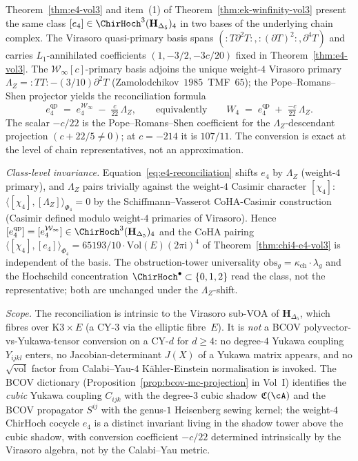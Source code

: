 \begin{remark}
\label{rem:e4-two-bases}
Theorem~\ref{thm:e4-vol3} and item~(1) of
Theorem~\ref{thm:ek-winfinity-vol3} present the same class
$[e_4]\in\ChirHoch^3(\mathbf H_{\Delta_5})_4$ in two bases of the
underlying chain complex. The Virasoro quasi-primary basis spans
$({:}T\partial^2T{:},{:}(\partial T)^2{:},\partial^4T)$ and carries
$L_1$-annihilated coefficients $(1,-3/2,-3c/20)$ fixed in
Theorem~\ref{thm:e4-vol3}. The $\mathcal W_\infty[c]$-primary basis
adjoins the unique weight-$4$ Virasoro primary
$\Lambda_Z={:}TT{:}-(3/10)\partial^2T$ (Zamolodchikov~$1985$~TMF~$65$);
the Pope--Romans--Shen projector yields the reconciliation formula
\begin{equation}\label{eq:e4-reconciliation}
 e_4^{\mathrm{qp}} \;=\; e_4^{\mathcal W_\infty}\;-\;\tfrac{c}{22}\,\Lambda_Z,
 \qquad\text{equivalently}\qquad
 W_4 \;=\; e_4^{\mathrm{qp}} \;+\;\tfrac{-c}{22}\,\Lambda_Z.
\end{equation}
The scalar $-c/22$ is the Pope--Romans--Shen coefficient for the
$\Lambda_Z$-descendant projection $(c+22/5\ne 0)$; at $c=-214$ it is
$107/11$. The conversion is exact at the level of chain
representatives, not an approximation.
\par\noindent\emph{Class-level invariance.} Equation~\ref{eq:e4-reconciliation}
shifts $e_4$ by $\Lambda_Z$ (weight-$4$ primary), and
$\Lambda_Z$ pairs trivially against the weight-$4$ Casimir
character $[\chi_4]$:
$\langle[\chi_4],[\Lambda_Z]\rangle_{\Phi_4}=0$ by the
Schiffmann--Vasserot CoHA-Casimir construction (Casimir defined modulo
weight-$4$ primaries of Virasoro).
Hence
$[e_4^{\mathrm{qp}}]=[e_4^{\mathcal W_\infty}]\in\ChirHoch^3(\mathbf H_{\Delta_5})_4$
and the CoHA pairing
$\langle[\chi_4],[e_4]\rangle_{\Phi_4}=65193/10\cdot\mathrm{Vol}(E)(2\pi\mathrm i)^4$
of Theorem~\ref{thm:chi4-e4-vol3} is independent of the basis.
The obstruction-tower universality
$\mathrm{obs}_g=\kappa_{\mathrm{ch}}\cdot\lambda_g$
and the Hochschild concentration $\ChirHoch^\bullet\subset\{0,1,2\}$
read the class, not the representative; both are unchanged under the
$\Lambda_Z$-shift.
\par\noindent\emph{Scope.} The reconciliation is intrinsic to the
Virasoro sub-VOA of $\mathbf H_{\Delta_5}$, which fibres over K$3\times E$
(a CY-$3$ via the elliptic fibre~$E$). It is \emph{not} a
BCOV polyvector-vs-Yukawa-tensor conversion on a CY-$d$ for
$d\ge 4$: no degree-$4$ Yukawa coupling $Y_{ijkl}$ enters, no
Jacobian-determinant $J(X)$ of a Yukawa matrix appears, and
no $\sqrt{\mathrm{vol}}$ factor from Calabi--Yau-$4$ Kähler-Einstein
normalisation is invoked. The BCOV dictionary
(Proposition~\ref{prop:bcov-mc-projection} in Vol~I) identifies the
\emph{cubic} Yukawa coupling $C_{ijk}$ with the degree-$3$ cubic
shadow $\mathfrak C(\cA)$ and the BCOV propagator $S^{ij}$ with the
genus-$1$ Heisenberg sewing kernel; the weight-$4$ ChirHoch cocycle
$e_4$ is a distinct invariant living in the shadow tower above the
cubic shadow, with conversion coefficient $-c/22$ determined
intrinsically by the Virasoro algebra, not by the Calabi--Yau
metric.
\end{remark}

